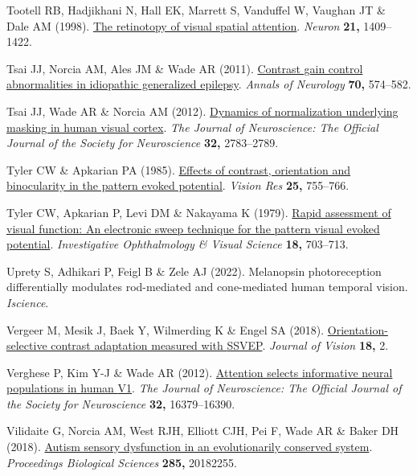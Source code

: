 \documentclass[
  letterpaper,
  DIV=11,
  numbers=noendperiod]{scrartcl}
\newlength{\cslhangindent}
\newenvironment{CSLReferences}[2] %
 {\begin{list}{}{%
  \setlength{\itemindent}{0pt}
  \setlength{\leftmargin}{0pt}
  \setlength{\parsep}{0pt}
  \ifodd #1
   \setlength{\leftmargin}{\cslhangindent}
   \setlength{\itemindent}{-1\cslhangindent}
  \fi
  \setlength{\itemsep}{#2\baselineskip}}}
 {\end{list}}
\begin{document}
\begin{CSLReferences}{1}{1}
Tootell RB, Hadjikhani N, Hall EK, Marrett S, Vanduffel W, Vaughan JT \&
Dale AM (1998). \href{https://doi.org/10.1016/s0896-6273(00)80659-5}{The
retinotopy of visual spatial attention}. \emph{Neuron} \textbf{21,}
1409--1422.

Tsai JJ, Norcia AM, Ales JM \& Wade AR (2011).
\href{https://doi.org/10.1002/ana.22462}{Contrast gain control
abnormalities in idiopathic generalized epilepsy}. \emph{Annals of
Neurology} \textbf{70,} 574--582.

Tsai JJ, Wade AR \& Norcia AM (2012).
\href{https://doi.org/10.1523/JNEUROSCI.4485-11.2012}{Dynamics of
normalization underlying masking in human visual cortex}. \emph{The
Journal of Neuroscience: The Official Journal of the Society for
Neuroscience} \textbf{32,} 2783--2789.

Tyler CW \& Apkarian PA (1985).
\href{https://doi.org/10.1016/0042-6989(85)90183-x}{Effects of contrast,
orientation and binocularity in the pattern evoked potential}.
\emph{Vision Res} \textbf{25,} 755--766.

Tyler CW, Apkarian P, Levi DM \& Nakayama K (1979).
\href{https://www.ncbi.nlm.nih.gov/pubmed/447469}{Rapid assessment of
visual function: An electronic sweep technique for the pattern visual
evoked potential}. \emph{Investigative Ophthalmology \& Visual Science}
\textbf{18,} 703--713.

Uprety S, Adhikari P, Feigl B \& Zele AJ (2022). Melanopsin
photoreception differentially modulates rod-mediated and cone-mediated
human temporal vision. \emph{Iscience}.

Vergeer M, Mesik J, Baek Y, Wilmerding K \& Engel SA (2018).
\href{https://doi.org/10.1167/18.5.2}{Orientation-selective contrast
adaptation measured with {SSVEP}}. \emph{Journal of Vision} \textbf{18,}
2.

Verghese P, Kim Y-J \& Wade AR (2012).
\href{https://doi.org/10.1523/JNEUROSCI.1174-12.2012}{Attention selects
informative neural populations in human {V1}}. \emph{The Journal of
Neuroscience: The Official Journal of the Society for Neuroscience}
\textbf{32,} 16379--16390.

Vilidaite G, Norcia AM, West RJH, Elliott CJH, Pei F, Wade AR \& Baker
DH (2018). \href{https://doi.org/10.1098/rspb.2018.2255}{Autism sensory
dysfunction in an evolutionarily conserved system}. \emph{Proceedings
Biological Sciences} \textbf{285,} 20182255.


\end{CSLReferences}
\end{document}
